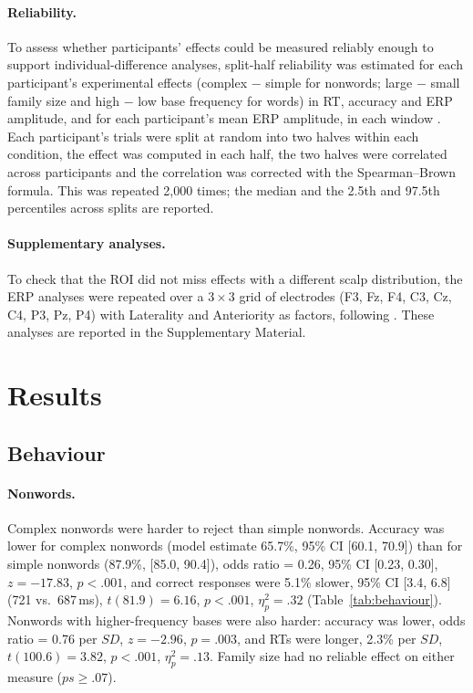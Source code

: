 \paragraph{Reliability.}
To assess whether participants' effects could be measured reliably enough to
support individual-difference analyses, split-half reliability was estimated
for each participant's experimental effects (complex $-$ simple for nonwords;
large $-$ small family size and high $-$ low base frequency for words) in RT,
accuracy and ERP amplitude, and for each participant's mean ERP amplitude, in
each window \citep{parsonsPsychologicalScienceNeeds2019}. %
Each participant's trials were split at random into two halves within each
condition, the effect was computed in each half, the two halves were correlated
across participants and the correlation was corrected with the Spearman--Brown
formula. This was repeated 2,000 times; the median and the 2.5th and 97.5th
percentiles across splits are reported.

\paragraph{Supplementary analyses.}
To check that the ROI did not miss effects with a different scalp distribution,
the ERP analyses were repeated over a $3 \times 3$ grid of electrodes (F3, Fz,
F4, C3, Cz, C4, P3, Pz, P4) with Laterality and Anteriority as factors,
following \citet{yumNeuralCorrelatesCrosslinguistic2014}. %
These analyses are reported in the Supplementary Material.

\section{Results}

\subsection{Behaviour}

\paragraph{Nonwords.}
Complex nonwords were harder to reject than simple nonwords. Accuracy was lower
for complex nonwords (model estimate 65.7\%, 95\% CI [60.1, 70.9]) than for
simple nonwords (87.9\%, [85.0, 90.4]), odds ratio = 0.26, 95\% CI [0.23, 0.30],
$z = -17.83$, $p < .001$, and correct responses were 5.1\% slower, 95\% CI
[3.4, 6.8] (721 vs.\ 687\,ms), $t(81.9) = 6.16$, $p < .001$, $\eta^2_p = .32$
(Table~\ref{tab:behaviour}). Nonwords with higher-frequency bases were also
harder: accuracy was lower, odds ratio = 0.76 per $SD$, $z = -2.96$, $p = .003$,
and RTs were longer, 2.3\% per $SD$, $t(100.6) = 3.82$, $p < .001$,
$\eta^2_p = .13$. Family size had no reliable effect on either measure
($ps \geq .07$).


